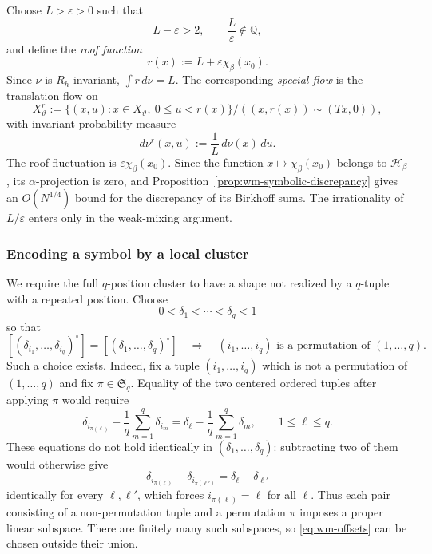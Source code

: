 \documentclass[11pt,reqno,a4paper]{amsart}
\numberwithin{equation}{section}
\theoremstyle{compact}
\theoremstyle{definition}
\theoremstyle{definition}
\begin{document}
Choose $L>\varepsilon>0$ such that
\begin{equation}\label{eq:wm-roof-parameters}
  L-\varepsilon>2,
  \qquad
  \frac{L}{\varepsilon}\notin\mathbb Q,
\end{equation}
and define the \emph{roof function}
\begin{equation}\label{eq:wm-roof}
  r(x):=L+\varepsilon\chi_\beta(x_0).
\end{equation}
Since $\nu$ is $R_h$-invariant, $\int r\,d\nu=L$.  The corresponding
\emph{special flow} is the translation flow on
\begin{equation}\label{eq:wm-special-flow-space}
  X_\vartheta^r
  :=\{(x,u):x\in X_\vartheta,\ 0\leq u<r(x)\}/
    ((x,r(x))\sim(Tx,0)),
\end{equation}
with invariant probability measure
\begin{equation}\label{eq:wm-suspension-measure}
  d\nu^r(x,u):=\frac1L\,d\nu(x)\,du.
\end{equation}
The roof fluctuation is $\varepsilon\chi_\beta(x_0)$.  Since the function $x\mapsto\chi_\beta(x_0)$ belongs to
$\mathcal H_\beta$, its $\alpha$-projection is zero, and
Proposition~\ref{prop:wm-symbolic-discrepancy} gives
an $O(N^{1/4})$ bound for the discrepancy of its Birkhoff sums.  The
irrationality of $L/\varepsilon$ enters only in the weak-mixing argument.

\subsubsection{Encoding a symbol by a local cluster}

We require the full $q$-position cluster to have a shape not realized by a
$q$-tuple with a repeated position.  Choose
\begin{equation}\label{eq:wm-offsets}
  0<\delta_1<\cdots<\delta_q<1
\end{equation}
so that
\begin{equation}\label{eq:wm-position-shape-separation}
  [(\delta_{i_1},\ldots,\delta_{i_q})^\circ]
  =[(\delta_1,\ldots,\delta_q)^\circ]
  \quad\Longrightarrow\quad
  (i_1,\ldots,i_q)\text{ is a permutation of }(1,\ldots,q).
\end{equation}
Such a choice exists.  Indeed, fix a tuple
$(i_1,\ldots,i_q)$ which is not a permutation of $(1,\ldots,q)$ and fix
$\pi\in\mathfrak S_q$.  Equality of the two centered ordered tuples after
applying $\pi$ would require
\[
  \delta_{i_{\pi(\ell)}}-\frac1q\sum_{m=1}^q\delta_{i_m}
  =\delta_\ell-\frac1q\sum_{m=1}^q\delta_m,
  \qquad 1\leq\ell\leq q.
\]
These equations do not hold identically in
$(\delta_1,\ldots,\delta_q)$: subtracting two of them would otherwise give
\[
  \delta_{i_{\pi(\ell)}}-\delta_{i_{\pi(\ell')}}
  =\delta_\ell-\delta_{\ell'}
\]
identically for every $\ell,\ell'$, which forces
$i_{\pi(\ell)}=\ell$ for all $\ell$.  Thus each pair consisting of a
non-permutation tuple and a permutation $\pi$ imposes a proper linear
subspace.  There are finitely many such subspaces, so
\eqref{eq:wm-offsets} can be chosen outside their union.
\end{document}
